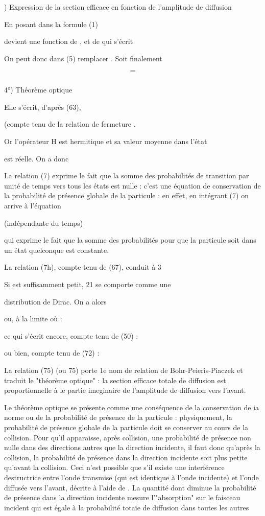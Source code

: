 ) Expression de la section efficace en fonction de l'amplitude  de diffusion

En posant dans la formule (1)

 

devient une fonction de , et de  qui s'écrit

On peut donc dans (5) remplacer . Soit finalement

\[
\tag{73}=
\]

\subsubsection{}%
4°) Théorème optique

Elle s'écrit, d'après (63),

(compte tenu de la relation de fermeture .

Or l'opérateur H est hermitique et sa valeur moyenne dans l'état 

est réelle. On a donc

La relation (7) exprime le fait que la somme des probabilités
de transition par unité de temps vers tous les états  est nulle :
c'est une équation de conservation de la probabilité de présence globale
de la particule : en effet, en intégrant (7) on arrive à l'équation

 (indépendante du temps)

qui exprime le fait que la somme des probabilités pour que la particule
soit dans un état  quelconque est constante.

La relation (7h), compte tenu de (67), conduit à 3

Si  est suffisamment petit, 21 se comporte comme une

distribution de Dirac. On a alors


ou, à la limite où  :

ce qui s'écrit encore, compte tenu de (50) :

ou bien, compte tenu de (72) :

La relation (75) (ou 75) porte 1e nom de relation de
Bohr-Peieris-Piaczek et traduit le "théorème optique" : la section
efficace totale de diffusion est proportionnelle à le partie imeginaire de
l'amplitude de diffusion vers l'avant.

Le théorème optique se présente comme une conséquence
de la conservation de ia norme ou de la probabilité de présence de la
particule : physiquement, la probabilité de présence globale de la particule
doit se conserver au cours de la collision. Pour qu'il apparaisse,
après collision, une probabilité de présence non nulle dans des directions
autres que la direction incidente, il faut donc qu'après la collision, la
probabilité de présence dans la direction incidente soit plus petite
qu'avant la collision. Ceci n'est possible que s'il existe une interférence
destructrice entre l'onde transmise (qui est identique à l'onde
incidente) et l'onde diffusée vers l'avant, décrite à l'aide de
. La quantité dont diminue la probabilité de présence dans la
direction incidente mesure l'"absorption" sur le faisceau incident qui
est égale à la probabilité totaïe de diffusion dans toutes les autres

